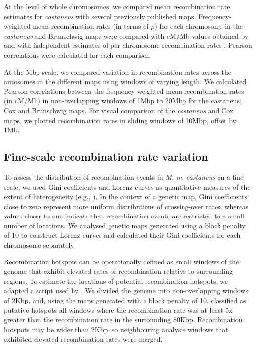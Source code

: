 At the level of whole chromosomes, we compared mean recombination rate estimates for \textit{castaneus} with several previously published maps. Frequency-weighted mean recombination rates (in terms of $\rho$) for each chromosome in the \textit{castaneus} and Brunschwig maps were compared with cM/Mb values obtained by \cite{RN232} and with independent estimates of per chromosome recombination rates \citep{RN184}. Pearson correlations were calculated for each comparison 
 
At the Mbp scale, we compared variation in recombination rates across the autosomes in the different maps using windows of varying length. We calculated Pearson correlations between the frequency weighted-mean recombination rates (in cM/Mb) in non-overlapping windows of 1Mbp to 20Mbp for the castaneus, Cox and Brunschwig maps. For visual comparison of the \textit{castaneus} and Cox maps, we plotted recombination rates in sliding windows of 10Mbp, offset by 1Mb. 

\subsection{Fine-scale recombination rate variation}

To assess the distribution of recombination events in \textit{M. m. castaneus} on a fine scale, we used Gini coefficients and Lorenz curves as quantitative measures of the extent of heterogeneity (e.g., \citealt{RN333}). In the context of a genetic map, Gini coefficients close to zero represent more uniform distributions of crossing-over rates, whereas values closer to one indicate that recombination events are restricted to a small number of locations. We analysed genetic maps generated using a block penalty of 10 to construct Lorenz curves and calculated their Gini coefficients for each chromosome separately.

	Recombination hotspots can be operationally defined as small windows of the genome that exhibit elevated rates of recombination relative to surrounding regions. To estimate the locations of potential recombination hotspots, we adapted a script used by \cite{RN258}. We divided the genome into non-overlapping windows of 2Kbp, and, using the maps generated with a block penalty of 10, classified as putative hotspots all windows where the recombination rate was at least 5x greater than the recombination rate in the surrounding 80Kbp. Recombination hotspots may be wider than 2Kbp, so neighbouring analysis windows that exhibited elevated recombination rates were merged.

